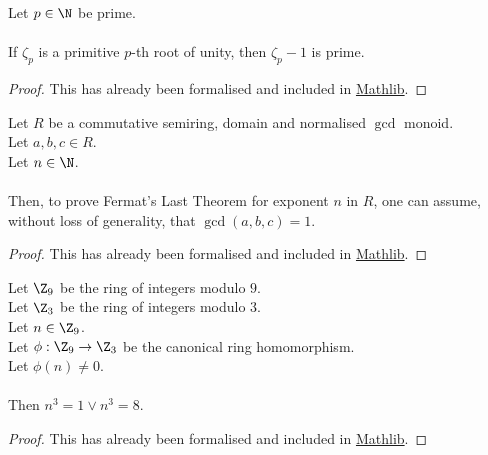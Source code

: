 \begin{theorem}
    \label{thm:zeta_sub_one_prime1}
    \leanok
    Let $p \in \N$ be prime. \\\\
    If $\zeta_p$ is a primitive $p$-th root of unity, then $\zeta_p - 1$ is prime.
\end{theorem}
\begin{proof}
    \leanok
    This has already been formalised and included in \href{https://pitmonticone.github.io/FLT3/docs/FLT3/Mathlib/NumberTheory/Cyclotomic/Rat.html#IsPrimitiveRoot.zeta_sub_one_prime'}{Mathlib}.
\end{proof}

\begin{lemma}
    \label{lmm:fermatLastTheoremWith_of_fermatLastTheoremWith_coprime}
    \leanok
    Let $R$ be a commutative semiring, domain and normalised $\gcd$ monoid.\\%
    Let $a, b, c \in R$. \\
    Let $n \in \N$. \\\\
    Then, to prove Fermat's Last Theorem for exponent $n$ in $R$,
    one can assume, without loss of generality, that $\gcd(a,b,c)=1$.
  \end{lemma}
  \begin{proof}
    \leanok
    This has already been formalised and included in \href{https://pitmonticone.github.io/FLT3/docs/FLT3/Mathlib/NumberTheory/FLT/Basic.html#fermatLastTheoremWith_of_fermatLastTheoremWith_coprime}{Mathlib}.
  \end{proof}

  \begin{lemma}
    \label{lmm:cube_of_castHom_ne_zero}
    \leanok
    Let $\Z_9$ be the ring of integers modulo $9$. \\
    Let $\Z_3$ be the ring of integers modulo $3$. \\
    Let $n \in \Z_9$. \\
    Let $\phi : \Z_9 \to \Z_3$ be the canonical ring homomorphism. \\
    Let $\phi(n) \neq 0$. \\ \\
    Then $n^3=1 \lor n^3=8$.
  \end{lemma}
  \begin{proof}
    \leanok
    This has already been formalised and included in \href{https://pitmonticone.github.io/FLT3/docs/FLT3/Mathlib/NumberTheory/FLT/Three.html#cube_of_castHom_ne_zero}{Mathlib}.
  \end{proof}
